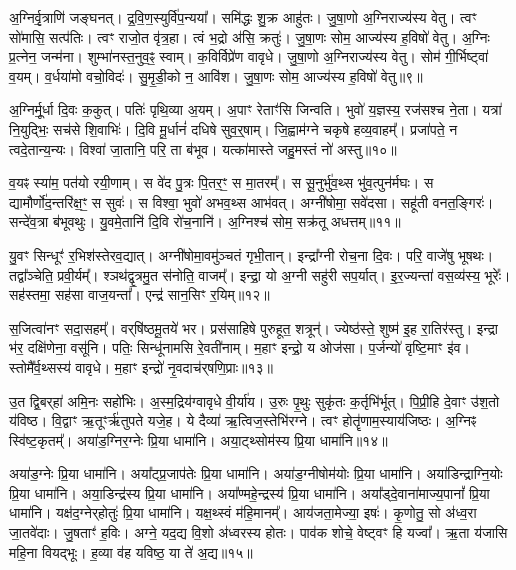 अ॒ग्निर्वृ॒त्राणि॑ जङ्घनत्।
द्र॒वि॒ण॒स्युर्वि॑प॒न्यया᳚।
समि॑द्धः शु॒क्र आहु॑तः।
जु॒षा॒णो अ॒ग्निराज्य॑स्य वेतु।
त्वꣳ सो॑मासि॒ सत्प॑तिः।
त्वꣳ राजो॒त वृ॑त्र॒हा।
त्वं भ॒द्रो अ॑सि॒ क्रतुः॑।
जु॒षा॒णः सोम॒ आज्य॑स्य ह॒विषो॑ वेतु।
अ॒ग्निः प्र॒त्नेन॒ जन्म॑ना।
शुम्भा॑नस्त॒नुव॒ꣴ॒ स्वाम्।
क॒विर्विप्रे॑ण वावृधे।
जु॒षा॒णो अ॒ग्निराज्य॑स्य वेतु।
सोम॑ गी॒र्भिष्ट्वा॑ व॒यम्।
व॒र्धया॑मो वचो॒विदः॑।
सु॒मृ॒डी॒को न॒ आवि॑श।
जु॒षा॒णः सोम॒ आज्य॑स्य ह॒विषो॑ वेतु॥९॥\anuvakamend[स्वाꣳ षट् च॑]

अ॒ग्निर्मू॒र्धा दि॒वः क॒कुत्।
पतिः॑ पृथि॒व्या अ॒यम्।
अ॒पाꣳ रेताꣳ॑सि जिन्वति।
भुवो॑ य॒ज्ञस्य॒ रज॑सश्च ने॒ता।
यत्रा॑ नि॒युद्भिः॒ सच॑से शि॒वाभिः॑।
दि॒वि मू॒र्धानं॑ दधिषे सुव॒र्॒षाम्।
जि॒ह्वाम॑ग्ने चकृषे हव्य॒वाहम्᳚।
प्रजा॑पते॒ न त्वदे॒तान्य॒न्यः।
विश्वा॑ जा॒तानि॒ परि॒ ता ब॑भूव।
यत्का॑मास्ते जहु॒मस्तं नो॑ अस्तु॥१०॥

व॒यꣴ स्या॑म॒ पत॑यो रयी॒णाम्।
स वे॑द पु॒त्रः पि॒तर॒ꣳ॒ स मा॒तरम्᳚।
स सू॒नुर्भु॑व॒थ्स भु॑व॒त्पुन॑र्मघः।
स द्यामौर्णो॑द॒न्तरि॑क्ष॒ꣳ॒ स सुवः॑।
स विश्वा॒ भुवो॑ अभव॒थ्स आभ॑वत्।
अग्नी॑षोमा॒ सवे॑दसा।
सहू॑ती वनत॒ङ्गिरः॑।
सन्दे॑व॒त्रा ब॑भूवथुः।
यु॒वमे॒तानि॑ दि॒वि रो॑च॒नानि॑।
अ॒ग्निश्च॑ सोम॒ सक्र॑तू अधत्तम्॥११॥

यु॒वꣳ सिन्धूꣳ॑ र॒भिश॑स्तेरव॒द्यात्।
अग्नी॑षोमा॒वमु॑ञ्चतं गृभी॒तान्।
इन्द्रा᳚ग्नी रोच॒ना दि॒वः।
परि॒ वाजे॑षु भूषथः।
तद्वा᳚ञ्चेति॒ प्रवी॒र्यम्᳚।
श्ञथ॑द्वृ॒त्रमु॒त स॑नोति॒ वाजम्᳚।
इन्द्रा॒ यो अ॒ग्नी सहु॑री सप॒र्यात्।
इ॒र॒ज्यन्ता॑ वस॒व्य॑स्य॒ भूरेः᳚।
सह॑स्तमा॒ सह॑सा वाज॒यन्ता᳚।
एन्द्र॑ सान॒सिꣳ र॒यिम्॥१२॥

स॒जित्वा॑नꣳ सदा॒सहम्᳚।
वर्‌\mbox{}षि॑ष्ठमू॒तये॑ भर।
प्रस॑साहिषे पुरुहूत॒ शत्रून्॑।
ज्येष्ठ॑स्ते॒ शुष्म॑ इ॒ह रा॒तिर॑स्तु।
इन्द्रा भ॑र॒ दक्षि॑णेना॒ वसू॑नि।
पतिः॒ सिन्धू॑नामसि रे॒वती॑नाम्।
म॒हाꣳ इन्द्रो॒ य ओज॑सा।
प॒र्जन्यो॑ वृष्टि॒माꣳ इ॑व।
स्तोमै᳚र्व॒थ्सस्य॑ वावृधे।
म॒हाꣳ इन्द्रो॑ नृ॒वदाच॑र्‌\mbox{}षणि॒प्राः॥१३॥

उ॒त द्वि॒बर्‌\mbox{}हा॑ अमि॒नः सहो॑भिः।
अ॒स्म॒द्रिय॑ग्वावृधे वी॒र्या॑य।
उ॒रुः पृ॒थुः सुकृ॑तः क॒र्तृभि॑र्भूत्।
पि॒प्री॒हि दे॒वाꣳ उ॑श॒तो य॑विष्ठ।
वि॒द्वाꣳ ऋ॒तूꣳर्\mbox{}ऋ॑तुपते यजे॒ह।
ये दैव्या॑ ऋ॒त्विज॒स्तेभि॑रग्ने।
त्वꣳ होतॄ॑णाम॒स्याय॑जिष्ठः।
अ॒ग्निꣴ स्वि॑ष्ट॒कृतम्᳚।
अया॑ड॒ग्निर॒ग्नेः प्रि॒या धामा॑नि।
अया॒ट्थ्सोम॑स्य प्रि॒या धामा॑नि॥१४॥

अया॑ड॒ग्नेः प्रि॒या धामा॑नि।
अया᳚ट्प्र॒जा\-प॑तेः प्रि॒या धामा॑नि।
अया॑ड॒ग्नीषोम॑योः प्रि॒या धामा॑नि।
अया॑डिन्द्राग्नि॒योः प्रि॒या धामा॑नि।
अया॒डिन्द्र॑स्य प्रि॒या धामा॑नि।
अया᳚ण्महे॒न्द्रस्य॑ प्रि॒या धामा॑नि।
अया᳚ड्दे॒वाना॑माज्य॒पानां᳚ प्रि॒या धामा॑नि।
यक्ष॑द॒ग्नेर्‌\mbox{}होतुः॑ प्रि॒या धामा॑नि।
यक्ष॒थ्स्वं म॑हि॒मानम्᳚।
आय॑जता॒मेज्या॒ इषः॑।
कृ॒णोतु॒ सो अ॑ध्व॒रा जा॒तवे॑दाः।
जु॒षताꣳ॑ ह॒विः।
अग्ने॒ यद॒द्य वि॒शो अ॑ध्वरस्य होतः।
पाव॑क शोचे॒ वेष्ट्वꣳ हि यज्वा᳚।
ऋ॒ता य॑जासि महि॒ना वियद्भूः।
ह॒व्या व॑ह यविष्ठ॒ या ते॑ अ॒द्य॥१५॥\anuvakamend[अ॒स्त्व॒ध॒त्त॒ꣳ॒ र॒यिं च॑र्‌\mbox{}षणि॒प्राः सोम॑स्य प्रि॒या धामा॒नीषः॒ षट्च॑]

